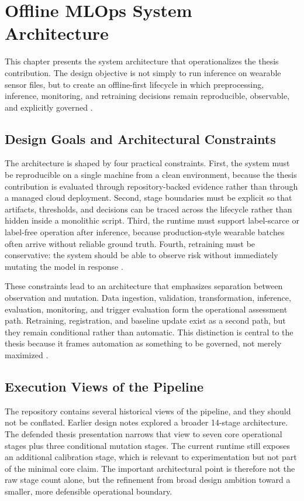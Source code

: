 \chapter{Offline MLOps System Architecture}
\label{chap:architecture}

This chapter presents the system architecture that operationalizes the thesis contribution. The design objective is not simply to run inference on wearable sensor files, but to create an offline-first lifecycle in which preprocessing, inference, monitoring, and retraining decisions remain reproducible, observable, and explicitly governed \cite{amershi2019mlops,kreuzberger2023mlops}.

\section{Design Goals and Architectural Constraints}

The architecture is shaped by four practical constraints. First, the system must be reproducible on a single machine from a clean environment, because the thesis contribution is evaluated through repository-backed evidence rather than through a managed cloud deployment. Second, stage boundaries must be explicit so that artifacts, thresholds, and decisions can be traced across the lifecycle rather than hidden inside a monolithic script. Third, the runtime must support label-scarce or label-free operation after inference, because production-style wearable batches often arrive without reliable ground truth. Fourth, retraining must be conservative: the system should be able to observe risk without immediately mutating the model in response \cite{amershi2019mlops,kreuzberger2023mlops}.

These constraints lead to an architecture that emphasizes separation between observation and mutation. Data ingestion, validation, transformation, inference, evaluation, monitoring, and trigger evaluation form the operational assessment path. Retraining, registration, and baseline update exist as a second path, but they remain conditional rather than automatic. This distinction is central to the thesis because it frames automation as something to be governed, not merely maximized \cite{hewage2022mlops}.

\section{Execution Views of the Pipeline}

The repository contains several historical views of the pipeline, and they should not be conflated. Earlier design notes explored a broader 14-stage architecture. The defended thesis presentation narrows that view to seven core operational stages plus three conditional mutation stages. The current runtime still exposes an additional calibration stage, which is relevant to experimentation but not part of the minimal core claim. The important architectural point is therefore not the raw stage count alone, but the refinement from broad design ambition toward a smaller, more defensible operational boundary.


